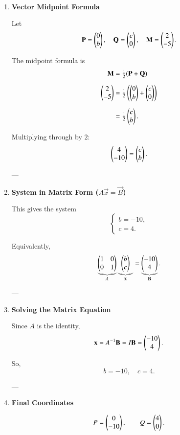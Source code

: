 \documentclass[journal]{IEEEtran}
\begin{document}
\begin{enumerate}
\item \textbf{Vector Midpoint Formula}

Let 
\[
\mathbf{P} = \begin{pmatrix}0 \\ b\end{pmatrix}, \quad 
\mathbf{Q} = \begin{pmatrix}c \\ 0\end{pmatrix}, \quad 
\mathbf{M} = \begin{pmatrix}2 \\ -5\end{pmatrix}.
\]

The midpoint formula is
\begin{align*}
\mathbf{M} &= \tfrac{1}{2}(\mathbf{P} + \mathbf{Q}) \\[6pt]
\begin{pmatrix}2 \\ -5\end{pmatrix} &= \tfrac{1}{2}\left(\begin{pmatrix}0 \\ b\end{pmatrix} + \begin{pmatrix}c \\ 0\end{pmatrix}\right) \\[6pt]
&= \tfrac{1}{2}\begin{pmatrix}c \\ b\end{pmatrix}.
\end{align*}

Multiplying through by $2$:
\[
\begin{pmatrix}4 \\ -10\end{pmatrix} = \begin{pmatrix}c \\ b\end{pmatrix}.
\]

---

\item \textbf{System in Matrix Form ($A\vec{x} = \vec{B}$)}

This gives the system
\[
\begin{cases}
b = -10,\\
c = 4.
\end{cases}
\]

Equivalently,
\[
\underbrace{\begin{pmatrix}1 & 0 \\ 0 & 1\end{pmatrix}}_{A}
\underbrace{\begin{pmatrix}b \\ c\end{pmatrix}}_{\mathbf{x}}
=
\underbrace{\begin{pmatrix}-10 \\ 4\end{pmatrix}}_{\mathbf{B}}.
\]

---

\item \textbf{Solving the Matrix Equation}

Since $A$ is the identity,
\[
\mathbf{x} = A^{-1}\mathbf{B} = I\mathbf{B} = \begin{pmatrix}-10 \\ 4\end{pmatrix}.
\]

So,
\[
b = -10, \quad c = 4.
\]

---

\item \textbf{Final Coordinates}

\[
P = \begin{pmatrix}0 \\ -10\end{pmatrix}, 
\qquad 
Q = \begin{pmatrix}4 \\ 0\end{pmatrix}.
\]

\end{enumerate}
\end{document}
